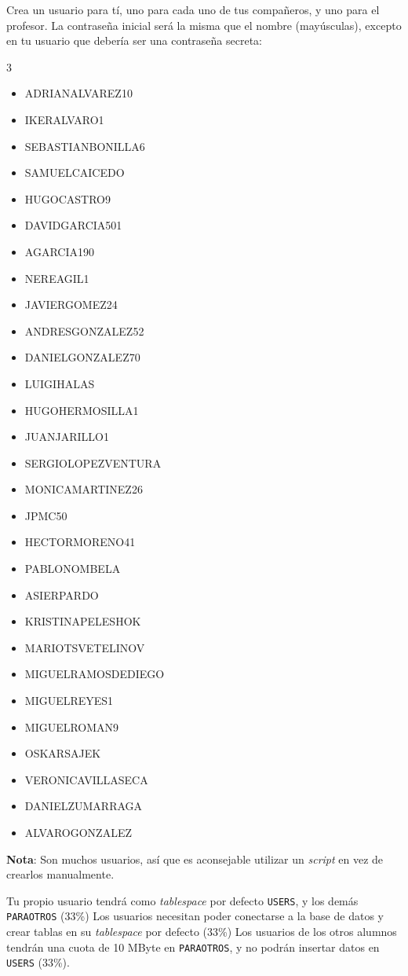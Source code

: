 \documentclass[a4paper]{article}
\begin{document}
Crea un usuario para tí, uno para cada uno de tus compañeros, y uno para el profesor. La contraseña inicial será la misma que el nombre (mayúsculas), excepto en tu usuario que debería ser una contraseña secreta:
\begin{multicols}{3}
\begin{itemize}
\item ADRIANALVAREZ10
\item IKERALVARO1
\item SEBASTIANBONILLA6
\item SAMUELCAICEDO
\item HUGOCASTRO9
\item DAVIDGARCIA501
\item AGARCIA190
\item NEREAGIL1
\item JAVIERGOMEZ24
\item ANDRESGONZALEZ52
\item DANIELGONZALEZ70
\item LUIGIHALAS
\item HUGOHERMOSILLA1
\item JUANJARILLO1
\item SERGIOLOPEZVENTURA
\item MONICAMARTINEZ26
\item JPMC50
\item HECTORMORENO41
\item PABLONOMBELA
\item ASIERPARDO
\item KRISTINAPELESHOK
\item MARIOTSVETELINOV
\item MIGUELRAMOSDEDIEGO
\item MIGUELREYES1
\item MIGUELROMAN9
\item OSKARSAJEK
\item VERONICAVILLASECA
\item DANIELZUMARRAGA
\item ALVAROGONZALEZ
\end{itemize}
\end{multicols}
\textbf{Nota}: Son muchos usuarios, así que es aconsejable utilizar un \emph{script} en vez de crearlos manualmente.

Tu propio usuario tendrá como \emph{tablespace} por defecto \texttt{USERS}, y los demás \texttt{PARAOTROS} (33\%)
Los usuarios necesitan poder conectarse a la base de datos y crear tablas en su \emph{tablespace} por defecto (33\%)
Los usuarios de los otros alumnos tendrán una cuota de 10 MByte en \texttt{PARAOTROS}, y no podrán insertar datos en \texttt{USERS} (33\%).
\end{document}

